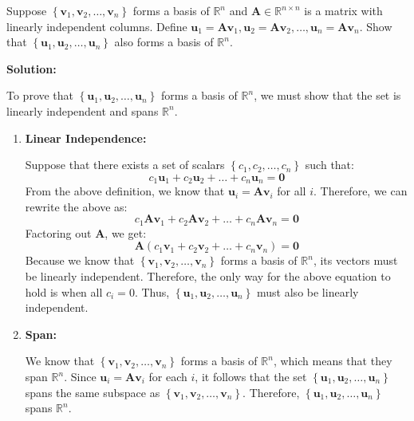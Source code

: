 Suppose $\left\{ \mathbf{v}_1, \mathbf{v}_2, \ldots, \mathbf{v}_n\right\}$ forms
a basis of $\mathbb{R}^n$ and $\mathbf{A} \in \mathbb{R}^{n \times n}$ is a
matrix with linearly independent columns. Define $\mathbf{u}_1 = \mathbf{A}
	\mathbf{v}_1, \mathbf{u}_2 = \mathbf{A} \mathbf{v}_2, \ldots , \mathbf{u}_n
	= \mathbf{A} \mathbf{v}_n$. Show that $\left\{ \mathbf{u}_1, \mathbf{u}_2,
	\ldots, \mathbf{u}_n\right\}$ also forms a basis of $\mathbb{R}^n$.

\begin{tcolorbox}
	\textbf{Solution:} \par
	To prove that $\left\{ \mathbf{u}_1, \mathbf{u}_2, \ldots, \mathbf{u}_n\right\}$
	forms a basis of $\mathbb{R}^n$, we must show that the set is linearly
	independent and spans $\mathbb{R}^n$.
	\begin{enumerate}
		\item \textbf{Linear Independence:} \par
		      Suppose that there exists a set of scalars $\left\{ c_1, c_2, \ldots,
			      c_n \right\}$ such that:
		      $$
			      c_1 \mathbf{u}_1 + c_2 \mathbf{u}_2 +
			      \ldots + c_n \mathbf{u}_n = \mathbf{0}
		      $$
		      From the above definition, we know that $\mathbf{u}_i =
			      \mathbf{A}\mathbf{v}_i$ for all $i$. Therefore, we can rewrite the
		      above as:
		      $$
			      c_1 \mathbf{A}\mathbf{v}_1 + c_2 \mathbf{A}\mathbf{v}_2 +
			      \ldots + c_n \mathbf{A}\mathbf{v}_n = \mathbf{0}
		      $$
		      Factoring out $\mathbf{A}$, we get:
		      $$
			      \mathbf{A} \left(c_1 \mathbf{v}_1 + c_2 \mathbf{v}_2 +
			      \ldots + c_n \mathbf{v}_n \right) = \mathbf{0}
		      $$
		      Because we know that $\left\{ \mathbf{v}_1, \mathbf{v}_2, \ldots,
			      \mathbf{v}_n\right\}$ forms a basis of $\mathbb{R}^n$, its
		      vectors must be linearly independent. Therefore, the only way
		      for the above equation to hold is when all $c_i = 0$. Thus,
		      $\left\{ \mathbf{u}_1, \mathbf{u}_2, \ldots,
			      \mathbf{u}_n\right\}$ must also be linearly independent.

		\item \textbf{Span:} \par
		      We know that $\left\{\mathbf{v}_1, \mathbf{v}_2, \ldots,
			      \mathbf{v}_n\right\}$ forms a basis of $\mathbb{R}^n$, which means
		      that they span $\mathbb{R}^n$. Since $\mathbf{u}_i = \mathbf{A}
			      \mathbf{v}_i$ for each $i$, it follows that the set $\left\{\mathbf{u}_1,
			      \mathbf{u}_2, \ldots, \mathbf{u}_n\right\}$ spans the same subspace as
		      $\left\{\mathbf{v}_1, \mathbf{v}_2, \ldots, \mathbf{v}_n\right\}$. Therefore,
		      $\left\{\mathbf{u}_1, \mathbf{u}_2, \ldots, \mathbf{u}_n\right\}$ spans $\mathbb{R}^n$.
	\end{enumerate}
\end{tcolorbox}
